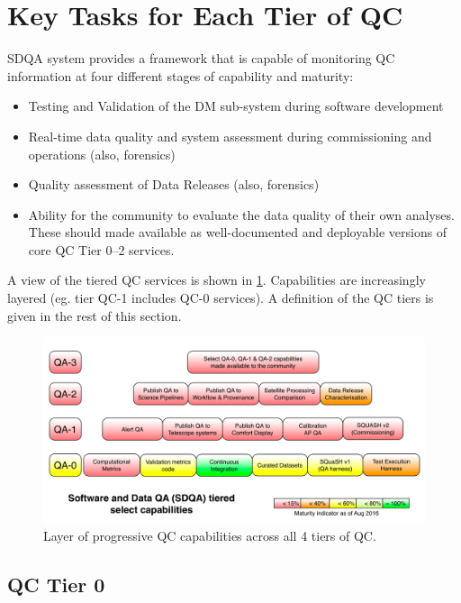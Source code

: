 \documentclass[DM,toc,lsstdraft]{lsstdoc}
\begin{document}
\section{Key Tasks for Each Tier of QC}

SDQA system provides a framework that is capable of monitoring QC information at four different stages of capability and maturity:

\begin{itemize}
\item[QC Tier 0] Testing and Validation of the DM sub-system during software development
\item[QC Tier 1] Real-time data quality and system assessment during commissioning and operations (also, forensics)
\item[QC Tier 2] Quality assessment of Data Releases (also, forensics)
\item[QC Tier 3] Ability for the community to evaluate the data quality of their own analyses. These should made available as well-documented and deployable versions of core QC Tier 0--2 services.
\end{itemize}

A view of the tiered QC services is shown in \ref{fig:qa-overview}. Capabilities are increasingly layered (eg. tier QC-1 includes QC-0 services). A definition of the QC tiers is given in the rest of this section.

\begin{figure}
\centering
\includegraphics[width=\textwidth]{qa_services}
\caption{Layer of progressive QC capabilities across all 4 tiers of QC.
\label{fig:qa-overview}}
\end{figure}



\subsection{QC Tier 0}
\end{document}
